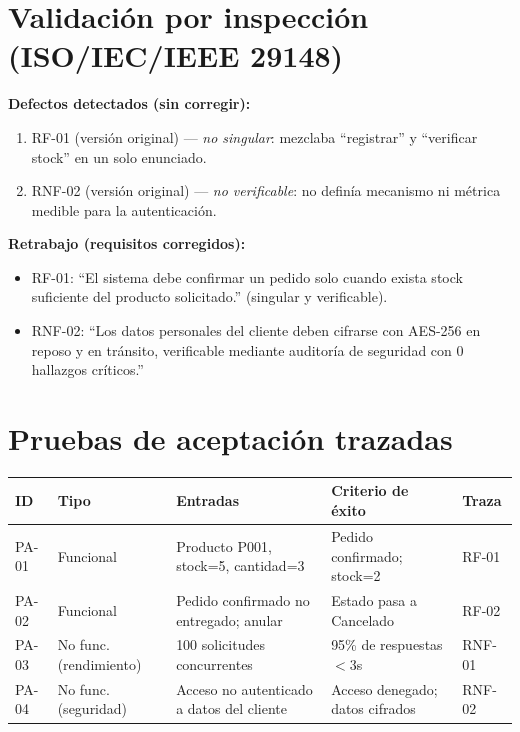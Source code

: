 \documentclass[11pt]{article}
\begin{document}
\section{Validación por inspección (ISO/IEC/IEEE 29148)}

\textbf{Defectos detectados (sin corregir):}
\begin{enumerate}[itemsep=1pt]
  \item RF-01 (versión original) --- \emph{no singular}: mezclaba ``registrar'' y ``verificar stock'' en un solo enunciado.
  \item RNF-02 (versión original) --- \emph{no verificable}: no definía mecanismo ni métrica medible para la autenticación.
\end{enumerate}

\textbf{Retrabajo (requisitos corregidos):}
\begin{itemize}[itemsep=1pt]
  \item RF-01: ``El sistema debe confirmar un pedido solo cuando exista stock suficiente del producto solicitado.'' (singular y verificable).
  \item RNF-02: ``Los datos personales del cliente deben cifrarse con AES-256 en reposo y en tránsito, verificable mediante auditoría de seguridad con 0 hallazgos críticos.''
\end{itemize}

\section{Pruebas de aceptación trazadas}

\begin{center}
\small
\begin{tabular}{p{1.1cm}p{2cm}p{3.7cm}p{3.7cm}p{0.9cm}}
\toprule
\textbf{ID} & \textbf{Tipo} & \textbf{Entradas} & \textbf{Criterio de éxito} & \textbf{Traza} \\
\midrule
PA-01 & Funcional & Producto P001, stock=5, cantidad=3 & Pedido confirmado; stock=2 & RF-01 \\
PA-02 & Funcional & Pedido confirmado no entregado; anular & Estado pasa a Cancelado & RF-02 \\
PA-03 & No func. (rendimiento) & 100 solicitudes concurrentes & 95\% de respuestas $<3$s & RNF-01 \\
PA-04 & No func. (seguridad) & Acceso no autenticado a datos del cliente & Acceso denegado; datos cifrados & RNF-02 \\
\bottomrule
\end{tabular}
\end{center}
\end{document}
